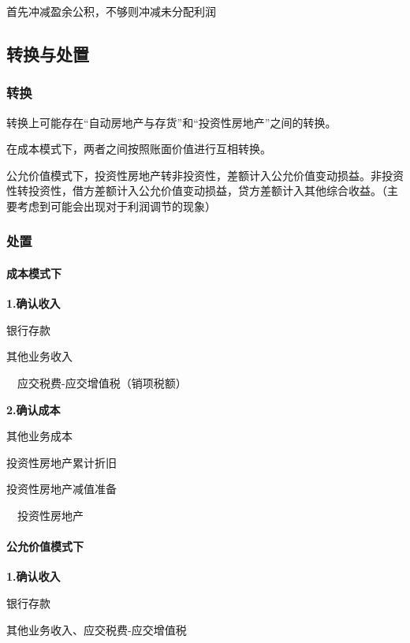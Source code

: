 \documentclass[UTF8,12pt]{ctexart}
\newenvironment{Dr}{%
	\begin{list}{}%
		{
			\setlength{\leftmargin}{2em}
			\setlength{\labelwidth}{2em}
			\setlength{\labelsep}{0pt}
			\setlength{\itemindent}{0pt}
			\setlength{\listparindent}{0pt}
			\setlength{\parsep}{0pt}
			\setlength{\topsep}{0pt}
		}
		\item[\textbf{借：}]
	}{%
	\end{list}
}
\newenvironment{Cr}{%
	\begin{list}{}%
		{
			\setlength{\leftmargin}{2em}
			\setlength{\labelwidth}{2em}
			\setlength{\labelsep}{0pt}
			\setlength{\itemindent}{0pt}
			\setlength{\listparindent}{0pt}
			\setlength{\parsep}{0pt}
			\setlength{\topsep}{0pt}
		}
		\item[\textbf{贷：}]
	}{%
	\end{list}
}
\numberwithin{equation}{section} %
\numberwithin{figure}{section}
\numberwithin{table}{section}
\begin{document}
	首先冲减盈余公积，不够则冲减未分配利润
	
	\subsection{转换与处置}
	\subsubsection{转换}
	转换上可能存在“自动房地产与存货”和“投资性房地产”之间的转换。
	
	在成本模式下，两者之间按照账面价值进行互相转换。
	
	公允价值模式下，投资性房地产转非投资性，差额计入公允价值变动损益。非投资性转投资性，借方差额计入公允价值变动损益，贷方差额计入其他综合收益。（主要考虑到可能会出现对于利润调节的现象）
	
	\subsubsection{处置}
	\paragraph{成本模式下}
	
	\textbf{1.确认收入}
	
	\begin{Dr}
		银行存款
	\end{Dr}
	\begin{Cr}
		其他业务收入
		
		\ \ 应交税费-应交增值税（销项税额）
	\end{Cr}

	
	\textbf{2.确认成本}
	
	\begin{Dr}
		其他业务成本
		
		投资性房地产累计折旧
		
		投资性房地产减值准备
	\end{Dr}
	\begin{Cr}
		\ \ 投资性房地产
	\end{Cr}

	
	\paragraph{公允价值模式下}
	\textbf{1.确认收入}
	
	\begin{Dr}
		银行存款
	\end{Dr}
	\begin{Cr}
		其他业务收入、应交税费-应交增值税
	\end{Cr}
	
\end{document}
